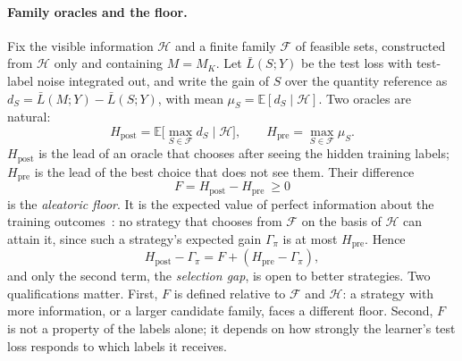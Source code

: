 \documentclass[runningheads]{llncs}
\newcommand{\Hpost}{H_{\mathrm{post}}}
\newcommand{\Hpre}{H_{\mathrm{pre}}}
\begin{document}
\paragraph{Family oracles and the floor.} Fix the visible information $\mathcal H$ and a finite family $\mathcal F$ of feasible sets, constructed from $\mathcal H$ only and containing $M=M_K$. Let $\bar L(S;Y)$ be the test loss with test-label noise integrated out, and write the gain of $S$ over the quantity reference as $d_S=\bar L(M;Y)-\bar L(S;Y)$, with mean $\mu_S=\mathbb E[d_S\mid\mathcal H]$. Two oracles are natural:
\begin{equation}
 \Hpost=\mathbb E\big[\max_{S\in\mathcal F}d_S\mid\mathcal H\big],\qquad
 \Hpre=\max_{S\in\mathcal F}\mu_S .
\end{equation}
$\Hpost$ is the lead of an oracle that chooses after seeing the hidden training labels; $\Hpre$ is the lead of the best choice that does not see them. Their difference
\begin{equation}
 F=\Hpost-\Hpre\ \ge 0
\end{equation}
is the \emph{aleatoric floor}. It is the expected value of perfect information about the training outcomes~\cite{howard1966information,raiffa1961applied}: no strategy that chooses from $\mathcal F$ on the basis of $\mathcal H$ can attain it, since such a strategy's expected gain $\Gamma_\pi$ is at most $\Hpre$. Hence
\begin{equation}
 \Hpost-\Gamma_\pi = F+(\Hpre-\Gamma_\pi),
\end{equation}
and only the second term, the \emph{selection gap}, is open to better strategies. Two qualifications matter. First, $F$ is defined relative to $\mathcal F$ and $\mathcal H$: a strategy with more information, or a larger candidate family, faces a different floor. Second, $F$ is not a property of the labels alone; it depends on how strongly the learner's test loss responds to which labels it receives.
\end{document}
